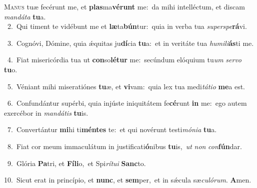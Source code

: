\lettrine{\initial\textcolor{\initialcolor}{M}}{anus} tuæ fecérunt me, et \textbf{plas}\-ma\-\textbf{vé}\-\textbf{runt} me:~\star da mihi intelléctum, et discam \textit{man}\-\textit{dá}\textit{ta} \textbf{tu}\-a.\\
{\numbfont\textcolor{\numbcolor}{~2.}}~Qui timent te vidébunt me et \textbf{læ}\-ta\-\textbf{bún}\-tur:~\star quia in verba tua \textit{su}\-\textit{per}\textit{spe}\textbf{rá}vi.\par
{\numbfont\textcolor{\numbcolor}{~3.}}~Cognóvi, Dómine, quia ǽquitas ju\-\textbf{dí}\-cia \textbf{tu}\-a:~\star et in veritáte tua \textit{hu}\-\textit{mi}\textit{li}\textbf{ás}ti me.\par
{\numbfont\textcolor{\numbcolor}{~4.}}~Fiat misericórdia tua ut \textbf{con}\-so\-\textbf{lé}\-\textbf{tur} me:~\star secúndum elóquium tu\textit{um} \textit{ser}\-\textit{vo} \textbf{tu}\-o.\par
{\numbfont\textcolor{\numbcolor}{~5.}}~Véniant mihi miseratiónes \textbf{tu}\-æ, et \textbf{vi}\-vam:~\star quia lex tua medi\-\textit{tá}\-\textit{ti}\textit{o} \textbf{me}\-a est.\par
{\numbfont\textcolor{\numbcolor}{~6.}}~Confundántur supérbi, quia injúste iniquitátem fe\-\textbf{cé}\-runt \textbf{in} me:~\star ego autem exercébor in \textit{man}\-\textit{dá}\textit{tis} \textbf{tu}\-is.\par
{\numbfont\textcolor{\numbcolor}{~7.}}~Convertántur \textbf{mi}\-hi ti\-\textbf{mén}\-\textbf{tes} te:~\star et qui novérunt testi\-\textit{mó}\-\textit{ni}\textit{a} \textbf{tu}\-a.\par
{\numbfont\textcolor{\numbcolor}{~8.}}~Fiat cor meum immaculátum in justificati\-\textbf{ó}\-nibus \textbf{tu}\-is,~\star \textit{ut} \textit{non} \textit{con}\-\textbf{fún}dar.\par
{\numbfont\textcolor{\numbcolor}{~9.}}~Glória \textbf{Pa}\-tri, et \textbf{Fí}\-\textbf{li}o,~\star et Spi\-\textit{rí}\-\textit{tu}\textit{i} \textbf{Sanc}\-to.\par
{\numbfont\textcolor{\numbcolor}{10.}}~Sicut erat in princípio, et \textbf{nunc}\-, et \textbf{sem}\-per,~\star et in sǽcula sæ\-\textit{cu}\-\textit{ló}\textit{rum}. \textbf{A}\-men.\par
